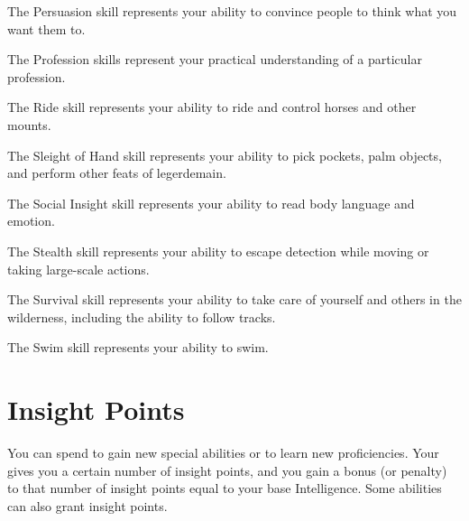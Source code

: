 \begin{raggeditemize}
        \item The Persuasion skill represents your ability to convince people to think what you want them to.
        \item The Profession skills represent your practical understanding of a particular profession.
        \item The Ride skill represents your ability to ride and control horses and other mounts.
        \item The Sleight of Hand skill represents your ability to pick pockets, palm objects, and perform other feats of legerdemain.
        \item The Social Insight skill represents your ability to read body language and emotion.
        \item The Stealth skill represents your ability to escape detection while moving or taking large-scale actions.
        \item The Survival skill represents your ability to take care of yourself and others in the wilderness, including the ability to follow tracks.
        \item The Swim skill represents your ability to swim.
    \end{raggeditemize}

\section{Insight Points}\label{Insight Points}
    You can spend  to gain new special abilities or to learn new proficiencies.
    Your  gives you a certain number of insight points, and you gain a bonus (or penalty) to that number of insight points equal to your base Intelligence.
    Some abilities can also grant insight points.

